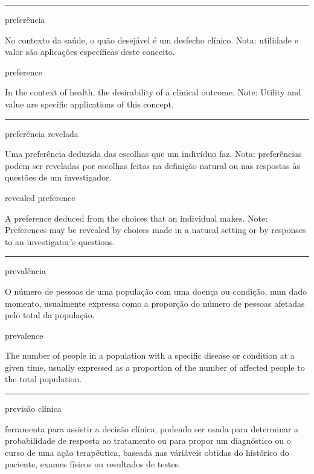 \documentclass[
  openany]{book}
\begin{document}
\begin{center}\rule{0.5\linewidth}{0.5pt}\end{center}

preferência

No contexto da saúde, o quão desejável é um desfecho clínico. Nota: utilidade e valor são aplicações específicas deste conceito.

preference

In the context of health, the desirability of a clinical outcome. Note: Utility and value are specific applications of this concept.

\begin{center}\rule{0.5\linewidth}{0.5pt}\end{center}

preferência revelada

Uma preferência deduzida das escolhas que um indivíduo faz. Nota: preferências podem ser reveladas por escolhas feitas na definição natural ou nas respostas às questões de um investigador.

revealed preference

A preference deduced from the choices that an individual makes. Note: Preferences may be revealed by choices made in a natural setting or by responses to an investigator's questions.

\begin{center}\rule{0.5\linewidth}{0.5pt}\end{center}

prevalência

O número de pessoas de uma população com uma doença ou condição, num dado momento, usualmente expressa como a proporção do número de pessoas afetadas pelo total da população.

prevalence

The number of people in a population with a specific disease or condition at a given time, usually expressed as a proportion of the number of affected people to the total population.

\begin{center}\rule{0.5\linewidth}{0.5pt}\end{center}

previsão clínica

ferramenta para assistir a decisão clínica, podendo ser usada para determinar a probabilidade de resposta ao tratamento ou para propor um diagnóstico ou o curso de uma ação terapêutica, baseada nas váriáveis obtidas do histórico do paciente, exames físicos ou resultados de testes.
\end{document}
